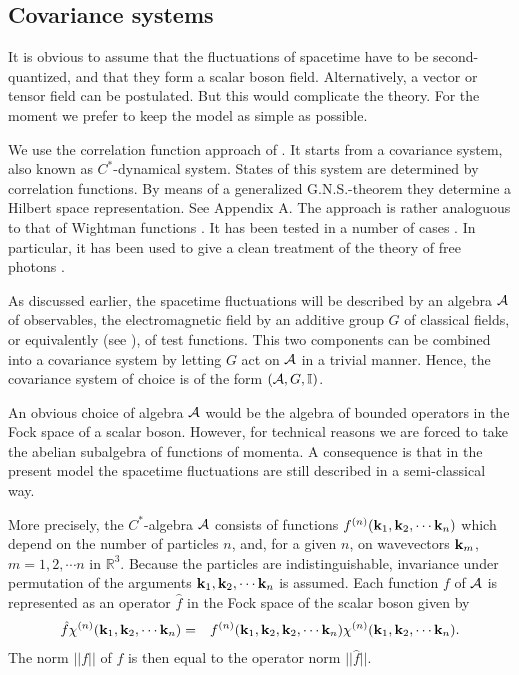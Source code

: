 \documentclass[12pt,a4paper]{article}
\def\Ro{{\mathbb R}}
\def\Io{{\mathbb I}}
\def\kk{{\bf k}}
\begin{document}
\subsection{Covariance systems}

It is obvious to assume that the fluctuations of spacetime
have to be second-quantized, and that they form a scalar boson field.
Alternatively, a vector or tensor field can be postulated.
But this would complicate the theory. For the moment we prefer
to keep the model as simple as possible.

We use the correlation function approach of \cite {NK01}.
It starts from a covariance system, also known as $C^*$-dynamical
system. States of this system are determined by correlation functions.
By means of a generalized G.N.S.-theorem they determine
a Hilbert space representation. See Appendix A.
The approach is rather analoguous to that of Wightman functions \cite {WAS56}.
It has been tested in a number of cases \cite {NK00,NJ02}.
In particular, it has been used to give a clean treatment
of the theory of free photons \cite {NK02}.

As discussed earlier, the spacetime fluctuations will
be described by an algebra $\cal A$ of observables,
the electromagnetic field by an additive group $G$ of classical
fields, or equivalently (see \cite {NK02}), of test functions.
This two components can be combined into a covariance
system by letting $G$ act on $\cal A$
in a trivial manner. Hence, the covariance system of
choice is of the form $({\cal A}, G, \Io)$.

An obvious choice of algebra $\cal A$ would be the algebra of 
bounded operators in the Fock space of a scalar boson. However, 
for technical reasons we are forced to take the abelian 
subalgebra of functions of momenta. A consequence 
is that in the present model the spacetime fluctuations are 
still described in a semi-classical way.

More precisely, the $C^*$-algebra $\cal A$ consists of
functions $f^{(n)}(\kk_1,\kk_2,\cdots\kk_n)$
which depend on the number of particles $n$, and, for a given $n$, on
wavevectors $\kk_m$, $m=1,2,\cdots n$ in $\Ro^3$.
Because the particles are indistinguishable, invariance
under permutation of the arguments $\kk_1,\kk_2,\cdots\kk_n$
is assumed. Each function $f$ of $\cal A$ is represented
as an operator $\hat f$ in the Fock space of the scalar boson
given by
\begin{eqnarray}
\hat f\chi^{(n)}(\kk_1,\kk_2,\cdots\kk_n)
&=&f^{(n)}(\kk_1,\kk_2,\kk_2,\cdots\kk_n)
\chi^{(n)}(\kk_1,\kk_2,\cdots\kk_n).
\label{fhatdef}
\end{eqnarray}
The norm $||f||$ of $f$ is then equal to the operator norm $||\hat f||$.
\end{document}
